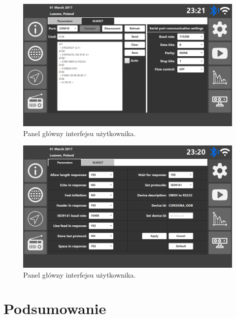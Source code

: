 \documentclass[12pt]{article} %
\numberwithin{equation}{subsection}
\numberwithin{figure}{section}
\numberwithin{table}{section}
\begin{document}
		\begin{figure}[!h]
			\centering
			\includegraphics[scale=0.5]{Images/user_interface_settings_elm_tab.png}
			\caption{Panel główny interfejsu użytkownika.}
			\label{user_interface_dashboard}
		\end{figure}
		
		\newpage
		
		\begin{figure}[!h]
			\centering
			\includegraphics[scale=0.5]{Images/user_interface_settings_parameters_tab.png}
			\caption{Panel główny interfejsu użytkownika.}
			\label{user_interface_dashboard}
		\end{figure}
	
	
	\newpage
	
\section{Podsumowanie}
	
	\hspace{0.5cm} 
	
	\newpage	
	
\end{document}

